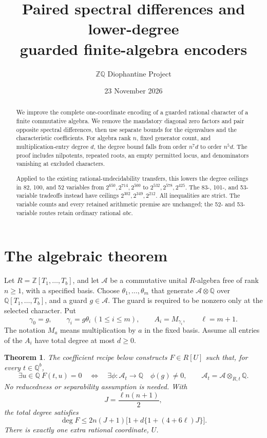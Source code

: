 \documentclass[11pt]{article}
\title{Paired spectral differences and lower-degree\\
guarded finite-algebra encoders}
\author{\(\mathbb Z\mathbb Q\) Diophantine Project}
\date{23 November 2026}
\newtheorem{theorem}{Theorem}
\newcommand{\Q}{\mathbb Q}\newcommand{\Z}{\mathbb Z}
\newcommand{\A}{\mathcal A}\newcommand{\Mat}{\operatorname{Mat}}
\begin{document}
\maketitle

\begin{abstract}
We improve the complete one-coordinate encoding of a guarded rational
character of a finite commutative algebra. We remove the mandatory
diagonal zero factors and pair opposite spectral differences, then use
separate bounds for the eigenvalues and the characteristic coefficients.
For algebra rank \(n\), fixed generator count, and multiplication-entry
degree \(d\), the degree bound falls from order \(n^7d\) to order
\(n^5d\). The proof includes nilpotents, repeated roots, an empty permitted
locus, and denominators vanishing at excluded characters.

Applied to the existing rational-undecidability transfers, this lowers
the degree ceilings in 82, 100, and 52 variables from
\(2^{650},2^{714},2^{500}\) to \(2^{532},2^{578},2^{425}\).
The 83-, 101-, and 53-variable tradeoffs instead have ceilings
\(2^{302},2^{349},2^{212}\). All inequalities are strict. The variable
counts and every retained arithmetic premise are unchanged; the
52- and 53-variable routes retain ordinary rational \(abc\).
\end{abstract}

\section{The algebraic theorem}

Let \(R=\Z[T_1,\ldots,T_b]\), and let \(\A\) be a commutative unital
\(R\)-algebra free of rank \(n\ge1\), with a specified basis. Choose
\(\theta_1,\ldots,\theta_m\) that generate
\(\A\otimes\Q\) over \(\Q[T_1,\ldots,T_b]\), and a guard
\(g\in\A\). The guard is required to be nonzero only at the selected
character. Put
\[
 \gamma_0=g,\qquad \gamma_i=g\theta_i\ (1\le i\le m),
 \qquad A_i=M_{\gamma_i},\qquad \ell=m+1.
\]
The notation \(M_a\) means multiplication by \(a\) in the fixed basis.
Assume all entries of the \(A_i\) have total degree at most \(d\ge0\).

\begin{theorem}\label{main}
The coefficient recipe below constructs \(F\in R[U]\) such that,
for every \(t\in\Q^b\),
\[
 \exists u\in\Q\ F(t,u)=0
 \quad\Longleftrightarrow\quad
 \exists\phi:\A_t\longrightarrow\Q\quad\phi(g)\ne0,
 \qquad \A_t=\A\otimes_{R,t}\Q.
\]
No reducedness or separability assumption is needed. With
\[
                  J=\frac{\ell n(n+1)}2,
\]
the total degree satisfies
\begin{equation}\label{degree}
 \boxed{\deg F\le
  2n(J+1)\bigl[1+d\{1+(4+6\ell)J\}\bigr].}
\end{equation}
There is exactly one extra rational coordinate, \(U\).
\end{theorem}
\end{document}
